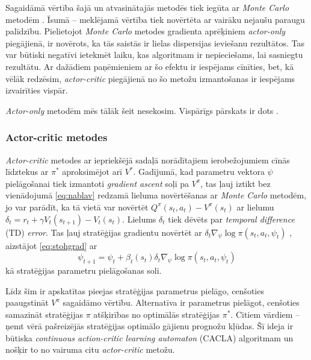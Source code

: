 \documentclass{ludis} %
\begin{document}
Sagaidāmā vērtība šajā un atvasinātajās metodēs tiek iegūta ar \textit{Monte
  Carlo} metodēm \autocite{halton1970retrospective}. Īsumā -- meklējamā vērtība
tiek novērtēta ar vairāku nejaušu paraugu palīdzību. Pielietojot \textit{Monte
  Carlo} metodes gradienta aprēķiniem \textit{actor-only} piegājienā, ir
novērots, ka tās saistās ir lielas dispersijas ieviešanu rezultātos. Tas var
būtiski negatīvi ietekmēt laiku, kas algoritmam ir nepieciešams, lai sasniegtu
rezultātu. Ar dažādiem paņēmieniem ar šo efektu ir iespējams cīnīties, bet, kā
vēlāk redzēsim, \textit{actor-critic} piegājienā no šo metožu izmantošanas ir
iespējams izvairīties vispār. %

\textit{Actor-only} metodēm mēs tālāk šeit nesekosim.
Vispārīgs pārskats ir dots \autocite{Hasselt2012}.
 
\subsubsection{Actor-critic metodes}
\textit{Actor-critic} metodes ar iepriekšējā sadaļā norādītajiem ierobežojumiem
cīnās līdztekus ar $\pi^*$ aproksimējot arī $V^*$. Gadījumā, kad parametru
vektora $\psi$ pielāgošanai tiek izmantoti \textit{gradient ascent} soļi pa
$V^\pi$, tas ļauj iztikt bez vienādojumā \eqref{eq:nablav} redzamā lieluma
novērtēšanas ar \textit{Monte Carlo} metodēm, jo var parādīt, ka tā vietā var
novērtēt $Q^\pi(s_t, a_t) - V^\pi(s_t)$ ar lielumu $\delta_t = r_{t} + \gamma
V_t(s_{t+1}) - V_t(s_t)$. Lielums $\delta_t$ tiek dēvēts par \textit{temporal
  difference} (TD) \textit{error}. Tas ļauj stratēģijas gradientu novērtēt ar
$\delta_t \nabla_\psi \log \pi(s_t,a_t,\psi_t)$ \autocite{sutton2000policy},
aizstājot \eqref{eq:stohgrad} ar
\begin{equation} \label{eq:psi}
	\psi_{t+1} = \psi_t + \beta_t(s_t) \delta_t \nabla_\psi \log \pi(s_t,a_t,\psi_t)
\end{equation}
kā stratēģijas parametru pielāgošanas soli.

Līdz šim ir apskatītas pieejas stratēģijas parametrus pielāgo, cenšoties
paaugstināt $V^\pi$ sagaidāmo vērtību. Alternatīva ir parametrus pielāgot,
cenšoties samazināt stratēģijas $\pi$ atšķirības no optimālās stratēģijas
$\pi^*$. Citiem vārdiem -- ņemt vērā pašreizējās stratēģijas optimālo gājienu
prognožu kļūdas. Šī ideja ir būtiska \textit{continuous action-critic learning
  automaton} (CACLA) algoritmam un nošķir to no vairuma citu
\textit{actor-critic} metožu.
\end{document}
